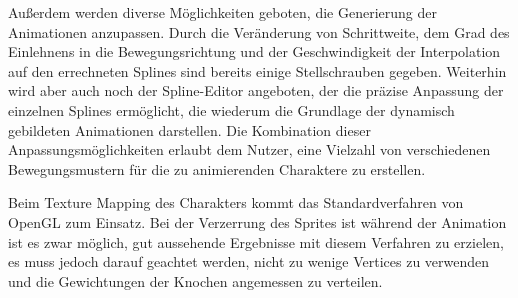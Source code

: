 Außerdem werden diverse Möglichkeiten geboten, die Generierung der Animationen anzupassen. Durch die Veränderung von Schrittweite, dem Grad des Einlehnens in die Bewegungsrichtung und der Geschwindigkeit der Interpolation auf den errechneten Splines sind bereits einige Stellschrauben gegeben. Weiterhin wird aber auch noch der Spline-Editor angeboten, der die präzise Anpassung der einzelnen Splines ermöglicht, die wiederum die Grundlage der dynamisch gebildeten Animationen darstellen. Die Kombination dieser Anpassungsmöglichkeiten erlaubt dem Nutzer, eine Vielzahl von verschiedenen Bewegungsmustern für die zu animierenden Charaktere zu erstellen.

Beim Texture Mapping des Charakters kommt das Standardverfahren von OpenGL zum Einsatz. Bei der Verzerrung des Sprites ist während der Animation ist es zwar möglich, gut aussehende Ergebnisse mit diesem Verfahren zu erzielen, es muss jedoch darauf geachtet werden, nicht zu wenige Vertices zu verwenden und die Gewichtungen der Knochen angemessen zu verteilen.

